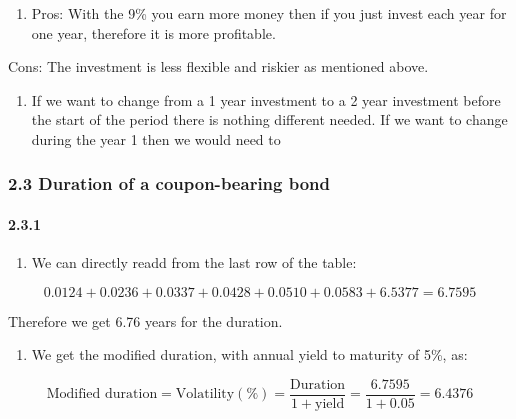 \documentclass[11pt]{article}
\providecommand{\tightlist}{%
      \setlength{\itemsep}{0pt}\setlength{\parskip}{0pt}}
\begin{document}
    \begin{enumerate}
\def\labelenumi{\alph{enumi})}
\setcounter{enumi}{2}
\tightlist
\item
  Pros: With the 9\% you earn more money then if you just invest each
  year for one year, therefore it is more profitable.
\end{enumerate}

Cons: The investment is less flexible and riskier as mentioned above.

    \begin{enumerate}
\def\labelenumi{\alph{enumi})}
\setcounter{enumi}{3}
\tightlist
\item
  If we want to change from a 1 year investment to a 2 year investment
  before the start of the period there is nothing different needed. If
  we want to change during the year 1 then we would need to
\end{enumerate}

    \hypertarget{duration-of-a-coupon-bearing-bond}{%
\subsubsection{2.3 Duration of a coupon-bearing
bond}\label{duration-of-a-coupon-bearing-bond}}

    \hypertarget{section}{%
\paragraph{2.3.1}\label{section}}

    \begin{enumerate}
\def\labelenumi{\alph{enumi})}
\tightlist
\item
  We can directly readd from the last row of the table:
\end{enumerate}

\[ 0.0124 + 0.0236 + 0.0337 + 0.0428 + 0.0510 + 0.0583 + 6.5377 = 6.7595 \]

Therefore we get 6.76 years for the duration.

    \begin{enumerate}
\def\labelenumi{\alph{enumi})}
\setcounter{enumi}{1}
\tightlist
\item
  We get the modified duration, with annual yield to maturity of 5\%,
  as:
\end{enumerate}

\[ \text{Modified duration} = \text{Volatility}(\%)=  \frac{\text{Duration}}{1+\text{yield}} = \frac{6.7595}{1+0.05} = 6.4376 \]
\end{document}
